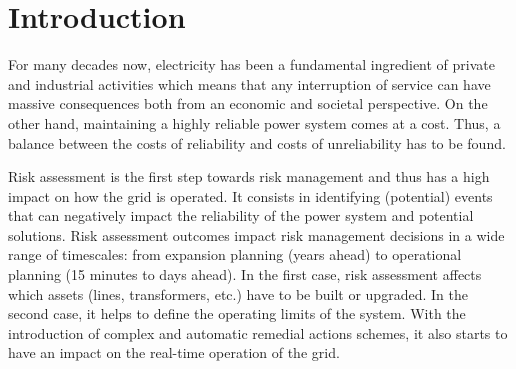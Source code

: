 \chapter{Introduction}

For many decades now, electricity has been a fundamental ingredient of private and industrial activities which means that any interruption of service can have massive consequences both from an economic and societal perspective. On the other hand, maintaining a highly reliable power system comes at a cost. Thus, a balance between the costs of reliability and costs of unreliability has to be found.

Risk assessment is the first step towards risk management and thus has a high impact on how the grid is operated. It consists in identifying (potential) events that can negatively impact the reliability of the power system and potential solutions. Risk assessment outcomes impact risk management decisions in a wide range of timescales: from expansion planning (years ahead) to operational planning (15 minutes to days ahead). In the first case, risk assessment affects which assets (lines, transformers, etc.) have to be built or upgraded. In the second case, it helps to define the operating limits of the system. With the introduction of complex and automatic remedial actions schemes, it also starts to have an impact on the real-time operation of the grid.


